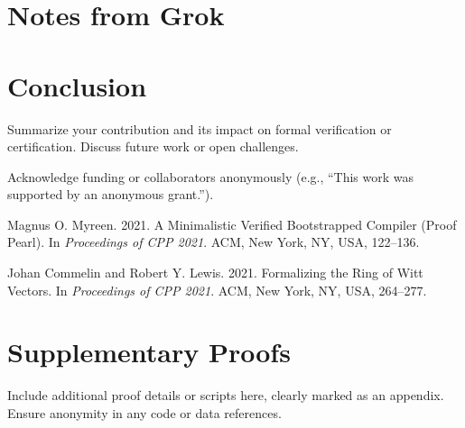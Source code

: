 \documentclass[sigplan,10pt,anonymous,review]{acmart}
\begin{document}
\section{Notes from Grok}


\section{Conclusion}
Summarize your contribution and its impact on formal verification or certification. Discuss future work or open challenges.

\begin{acks}
Acknowledge funding or collaborators anonymously (e.g., ``This work was supported by an anonymous grant.'').
\end{acks}


\begin{thebibliography}{2}
Magnus O. Myreen. 2021. A Minimalistic Verified Bootstrapped Compiler (Proof Pearl). In \textit{Proceedings of CPP 2021}. ACM, New York, NY, USA, 122--136.

Johan Commelin and Robert Y. Lewis. 2021. Formalizing the Ring of Witt Vectors. In \textit{Proceedings of CPP 2021}. ACM, New York, NY, USA, 264--277.
\end{thebibliography}

\appendix
\section{Supplementary Proofs}
Include additional proof details or scripts here, clearly marked as an appendix. Ensure anonymity in any code or data references.
\end{document}
